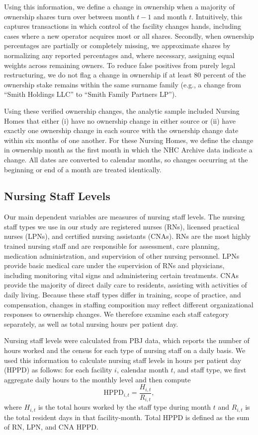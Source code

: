 \documentclass[preprint,authoryear]{elsarticle}
\begin{document}
Using this information, we define a change in ownership when a majority of ownership shares turn over between month $t-1$ and month $t$. Intuitively, this captures transactions in which control of the facility changes hands, including cases where a new operator acquires most or all shares. Secondly, when ownership percentages are partially or completely missing, we approximate shares by normalizing any reported percentages and, where necessary, assigning equal weights across remaining owners. To reduce false positives from purely legal restructuring, we do not flag a change in ownership if at least 80 percent of the ownership stake remains within the same surname family (e.g., a change from “Smith Holdings LLC” to “Smith Family Partners LP”). 

Using these verified ownership changes, the analytic sample included Nursing Homes that either (i) have no ownership change in either source or (ii) have exactly one ownership change in each source with the ownership change date within six months of one another. For these Nursing Homes, we define the change in ownership month as the first month in which the NHC Archive data indicate a change. All dates are converted to calendar months, so changes occurring at the beginning or end of a month are treated identically. 

\subsection{Nursing Staff Levels}

Our main dependent variables are measures of nursing staff levels. The nursing staff types we use in our study are registered nurses (RNs), licensed practical nurses (LPNs), and certified nursing assistants (CNAs). RNs are the most highly trained nursing staff and are responsible for assessment, care planning, medication administration, and supervision of other nursing personnel. LPNs provide basic medical care under the supervision of RNs and physicians, including monitoring vital signs and administering certain treatments. CNAs provide the majority of direct daily care to residents, assisting with activities of daily living. Because these staff types differ in training, scope of practice, and compensation, changes in staffing composition may reflect different organizational responses to ownership changes. We therefore examine each staff category separately, as well as total nursing hours per patient day. 

Nursing staff levels were calculated from PBJ data, which reports the number of hours worked and the census for each type of nursing staff on a daily basis. We used this information to calculate nursing staff levels in hours per patient day (HPPD) as follows: for each facility $i$, calendar month $t$, and staff type, we first aggregate daily hours to the monthly level and then compute
\begin{equation}
  \text{HPPD}_{i,t} = \frac{H_{i,t}}{R_{i,t}},
\end{equation}
where $H_{i,t}$ is the total hours worked by the staff type during month $t$ and $R_{i,t}$ is the total resident days in that facility-month. Total HPPD is defined as the sum of RN, LPN, and CNA HPPD.
\end{document}
